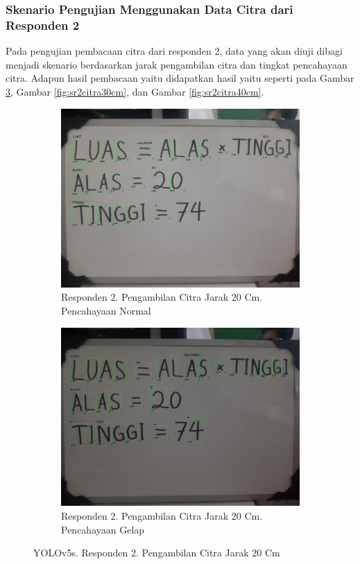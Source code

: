 \subsubsection{Skenario Pengujian Menggunakan Data Citra dari Responden 2}
\label{subsubsec:sskenarioresponden2}

Pada pengujian pembacaan citra dari responden 2, data yang akan diuji dibagi menjadi skenario berdasarkan jarak pengambilan citra dan tingkat pencahayaan citra. Adapun hasil pembacaan yaitu didapatkan hasil yaitu seperti pada Gambar \ref*{fig:sr2citra20cm}, Gambar \ref*{fig:sr2citra30cm}, dan Gambar \ref*{fig:sr2citra40cm}.
 
\begin{figure}[H]
  \begin{subfigure}{.5\textwidth}
    \centering
    \captionsetup{width=.8\linewidth}
    \includegraphics[width=.8\linewidth]{gambar/yolov5s/responden2/ghiyas20cm00-result.jpg}
    \caption{Responden 2. Pengambilan Citra Jarak 20 Cm. Pencahayaan Normal}
    \label{fig:sr2tcitra20cm}
  \end{subfigure}%
  \begin{subfigure}{.5\textwidth}
    \centering
    \captionsetup{width=.8\linewidth}
    \includegraphics[width=.8\linewidth]{gambar/yolov5s/responden2/ghiyas20cm10-result.jpg}
    \caption{Responden 2. Pengambilan Citra Jarak 20 Cm. Pencahayaan Gelap}
    \label{fig:sr2gcitra20cm}
  \end{subfigure}
  \caption{YOLOv5s. Responden 2. Pengambilan Citra Jarak 20 Cm}
  \label{fig:sr2citra20cm}
\end{figure}

